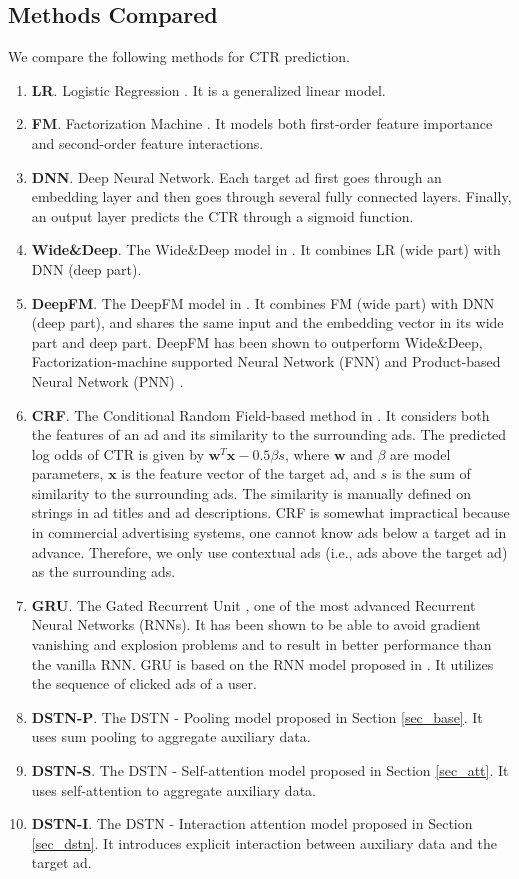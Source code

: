 \documentclass[sigconf]{acmart}
\begin{document}
\subsection{Methods Compared}
We compare the following methods for CTR prediction.
\begin{enumerate}
\item \textbf{LR}. Logistic Regression \cite{bishop2006pattern}. It is a generalized linear model.
\item \textbf{FM}. Factorization Machine \cite{rendle2010factorization}. It models both first-order feature importance and second-order feature interactions.
\item \textbf{DNN}. Deep Neural Network. Each target ad first goes through an embedding layer and then goes through several fully connected layers. Finally, an output layer predicts the CTR through a sigmoid function.
\item \textbf{Wide\&Deep}. The Wide\&Deep model in \cite{cheng2016wide}. It combines LR (wide part) with DNN (deep part).
\item \textbf{DeepFM}. The DeepFM model in \cite{guo2017deepfm}. It combines FM (wide part) with DNN (deep part), and shares the same input and the embedding vector in its wide part and deep part. DeepFM has been shown to outperform Wide\&Deep, Factorization-machine supported Neural Network (FNN) \cite{zhang2016deep} and Product-based Neural Network (PNN) \cite{qu2016product}.
\item \textbf{CRF}. The Conditional Random Field-based method in \cite{xiong2012relational}. It considers both the features of an ad
    and its similarity to the surrounding ads. The predicted log odds of CTR is given by $\mathbf{w}^T \mathbf{x} - 0.5 \beta s$, where $\mathbf{w}$ and $\beta$ are model parameters, $\mathbf{x}$ is the feature vector of the target ad, and $s$ is the sum of similarity to the surrounding ads. The similarity is manually defined on strings in ad titles and ad descriptions. CRF is somewhat impractical because in commercial advertising systems, one cannot know ads below a target ad in advance. Therefore, we only use contextual ads (i.e., ads above the target ad) as the surrounding ads.
\item \textbf{GRU}. The Gated Recurrent Unit \cite{chung2014empirical}, one of the most advanced Recurrent Neural Networks (RNNs). It has been shown to be able to avoid gradient vanishing and explosion problems and to result in better performance than the vanilla RNN. GRU is based on the RNN model proposed in \cite{zhang2014sequential}. It utilizes the sequence of clicked ads of a user.
\item \textbf{DSTN-P}. The DSTN - Pooling model proposed in Section \ref{sec_base}. It uses sum pooling to aggregate auxiliary data.
\item \textbf{DSTN-S}. The DSTN - Self-attention model proposed in Section \ref{sec_att}. It uses self-attention to aggregate auxiliary data.
\item \textbf{DSTN-I}. The DSTN - Interaction attention model proposed in Section \ref{sec_dstn}. It introduces explicit interaction between auxiliary data and the target ad.
\end{enumerate}
\end{document}
